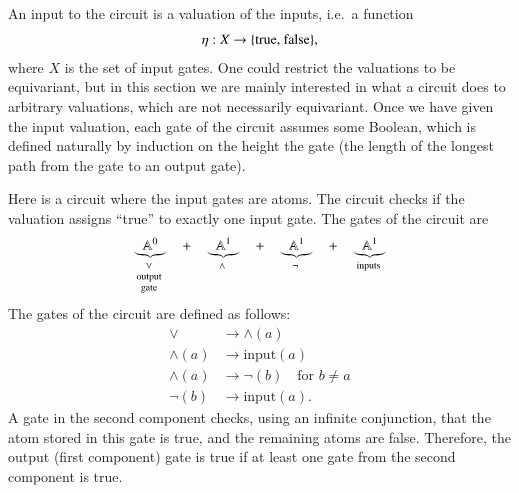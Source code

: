 An input to the circuit is a valuation of the inputs, i.e.~a function 
\begin{align*}
	 \eta : X \to \{\text{true, false}\},
\end{align*}
where $X$ is the set of input gates.
One could restrict the valuations to be equivariant, but in this section we are mainly interested in what a circuit does to arbitrary valuations, which are not necessarily equivariant. Once we have given the input valuation, each gate of the circuit assumes some Boolean, which is defined naturally by induction on the height the gate (the length of the longest path from the gate to an output gate). 

\begin{myexample}
\label{ex:exactly-one-input-true}
	Here is a circuit where the input gates are atoms.  The circuit checks if the valuation assigns ``true'' to exactly one input gate.  The gates of the circuit are
	\begin{align*}
	\myunderbrace{\atoms^0}{$\lor$\\ output \\ gate} \quad + \quad \myunderbrace{\atoms^1}{$\land$} 
	\quad + \quad \myunderbrace{\atoms^1}{$\neg$}
	\quad + \quad \myunderbrace{\atoms^1}{inputs}
	\end{align*}
	The gates of the circuit are defined as follows: 
	\begin{align*}
	\lor & \to \land(a)\\
	\land(a) & \to \text{input}(a)\\
	\land(a) & \to \neg(b) \quad \text{for $b \neq a$}\\
	\neg(b) & \to \text{input}(a).
	\end{align*}
	A gate in the second component checks, using an infinite conjunction,  that the atom stored in this gate is true, and the remaining atoms are false. Therefore, the output (first component) gate is true if at least one gate from the second component is true.  
\end{myexample}

